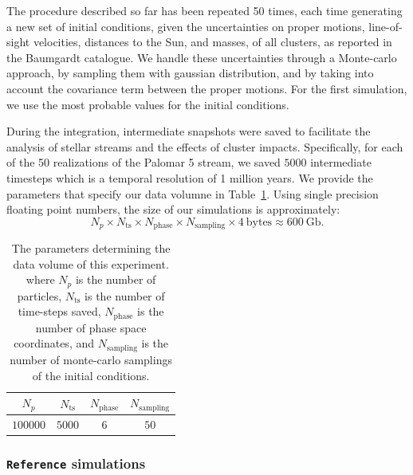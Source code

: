 \documentclass[draft]{aa}
\begin{document}
    The procedure described so far has been repeated 50 times, each time generating a new set of initial conditions, given the uncertainties on proper motions, line-of-sight velocities, distances to the Sun, and masses, of all clusters, as reported in the Baumgardt catalogue. We handle these uncertainties  through a Monte-carlo approach, by sampling them with gaussian distribution, and by taking into account the covariance term between the proper motions. For the first simulation, we use the most probable values for the initial conditions. 


    During the integration, intermediate snapshots were saved to facilitate the analysis of stellar streams and the effects of cluster impacts. Specifically, for each of the 50 realizations of the Palomar 5 stream, we saved $5000$ intermediate timesteps which is a temporal resolution of 1 million years. We provide the parameters that specify our data volumne in Table~\ref{tab:data_volume}. Using single precision floating point numbers, the size of our simulations is approximately:
    \begin{equation} \label{eq:data_volume_estimate}
      N_p \times N_{\textrm{ts}}\times N_{\textrm{phase}}\times N_{\textrm{sampling}} \times 4~\textrm{bytes}\approx 600~\textrm{Gb}.
    \end{equation}

    \begin{table}[h]
      \centering
      \begin{tabular}{|c|c|c|c|}
          \hline
          $N_p$ & $N_{\textrm{ts}}$ & $N_{\textrm{phase}}$ & $N_{\textrm{sampling}}$ \\
          \hline
          $100000$ & $5000$ & $6$ & $50$ \\
          \hline
      \end{tabular}
      \caption{The parameters determining the data volume of this experiment. where $N_p$  is the number of particles, $N_{\textrm{ts}}$ is the number of time-steps saved, $N_{\textrm{phase}}$ is the number of phase space coordinates, and $N_{\textrm{sampling}}$ is the number of monte-carlo samplings of the initial conditions.}
      \label{tab:data_volume}
  \end{table}

  \subsubsection*{ \texttt{Reference} simulations}
\end{document}
